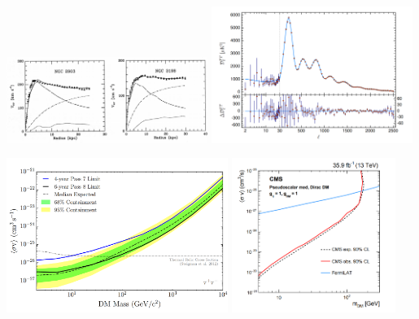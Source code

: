\documentclass[aspectratio=169,xcolor=dvipsnames,,table,compress]{beamer}
\begin{document}
\backupbegin



\begin{frame}
    \includegraphics[width=0.49\textwidth]{../figures/theory/dm_rot.png}
    \includegraphics[width=0.49\textwidth]{../figures/theory/planck.png}
\end{frame}

\begin{frame}
    \includegraphics[width=0.54\textwidth]{../figures/theory/fermilat.png}
    \includegraphics[width=0.4\textwidth]{../figures/theory/monojet.png}
\end{frame}
\end{document}
